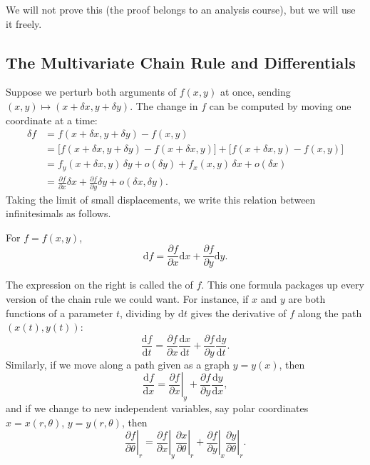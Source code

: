 We will not prove this (the proof belongs to an analysis course), but we will use it freely.

\subsection{The Multivariate Chain Rule and Differentials}

Suppose we perturb both arguments of $f(x, y)$ at once, sending $(x, y) \mapsto (x + \delta x, y + \delta y)$. The change in $f$ can be computed by moving one coordinate at a time:
\begin{align*}
	\delta f &= f(x + \delta x, y + \delta y) - f(x, y) \\
	&= \big[f(x + \delta x, y + \delta y) - f(x + \delta x, y)\big] + \big[f(x + \delta x, y) - f(x, y)\big] \\
	&= f_y(x + \delta x, y) \, \delta y + o(\delta y) + f_x(x, y)\, \delta x + o(\delta x) \\
	&= \frac{\partial f}{\partial x} \delta x + \frac{\partial f}{\partial y} \delta y + o(\delta x, \delta y).
\end{align*}
Taking the limit of small displacements, we write this relation between infinitesimals as follows.

\begin{theorem}
	For $f = f(x, y)$,
	$$
	\mathrm{d}f = \frac{\partial f}{\partial x} \mathrm{d}x + \frac{\partial f}{\partial y} \mathrm{d}y.
	$$
\end{theorem}

The expression on the right is called the  of $f$. This one formula packages up every version of the chain rule we could want. For instance, if $x$ and $y$ are both functions of a parameter $t$, dividing by $\mathrm{d}t$ gives the derivative of $f$ along the path $(x(t), y(t))$:
$$
\frac{\mathrm{d}f}{\mathrm{d}t} = \frac{\partial f}{\partial x} \frac{\mathrm{d}x}{\mathrm{d}t} + \frac{\partial f}{\partial y} \frac{\mathrm{d}y}{\mathrm{d}t}.
$$
Similarly, if we move along a path given as a graph $y = y(x)$, then
$$
\frac{\mathrm{d}f}{\mathrm{d}x} = \left.\frac{\partial f}{\partial x}\right|_y + \frac{\partial f}{\partial y} \frac{\mathrm{d}y}{\mathrm{d}x},
$$
and if we change to new independent variables, say polar coordinates $x = x(r, \theta)$, $y = y(r, \theta)$, then
$$
\left.\frac{\partial f}{\partial \theta}\right|_r = \left.\frac{\partial f}{\partial x}\right|_y \left.\frac{\partial x}{\partial \theta}\right|_r + \left.\frac{\partial f}{\partial y}\right|_x \left.\frac{\partial y}{\partial \theta}\right|_r.
$$


